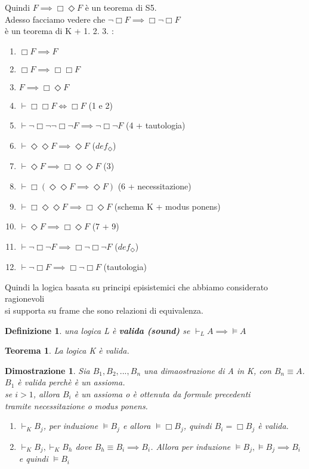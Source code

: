 \documentclass[a4paper,12pt]{article}
\theoremstyle{def}
\newtheorem*{definition}{Definizione}
\theoremstyle{prop}
\theoremstyle{esempio}
\theoremstyle{dimostrazione}
\newtheorem*{dimostrazione}{Dimostrazione}
\theoremstyle{teo}
\newtheorem*{teorema}{Teorema}
\theoremstyle{osservazione}
\begin{document}
Quindi \(F \implies \Box \Diamond F\) è un teorema di S5.\\
\newpage
Adesso facciamo vedere che \(\neg \Box F \implies \Box \neg \Box F\)\\
è un teorema di K + 1. 2. 3. :
\begin{enumerate}
	\item \(\Box F \implies F\)
	\item \(\Box F \implies \Box \Box F\)
	\item \(F \implies \Box \Diamond F\)
	\item \(\vdash \Box \Box F \iff \Box F\) (1 e 2)
	\item \(\vdash \neg \Box \neg \neg \Box \neg F \implies \neg \Box \neg F\) (4 + tautologia)
	\item \(\vdash \Diamond \Diamond F \implies \Diamond F\) (\(def_\Diamond\))
	\item \(\vdash \Diamond F \implies \Box \Diamond \Diamond F\) (3)
	\item \(\vdash \Box(\Diamond \Diamond F \implies \Diamond F)\) (6 + necessitazione)
	\item \(\vdash \Box \Diamond \Diamond F \implies \Box \Diamond F\) (schema K + modus ponens)
	\item \(\vdash \Diamond F \implies \Box \Diamond F\) (7 + 9)
	\item \(\vdash \neg \Box \neg F \implies \Box \neg \Box \neg F\) (\(def_\Diamond\))
	\item \(\vdash \neg \Box F \implies \Box \neg \Box F\) (tautologia)
\end{enumerate}
Quindi la logica basata su principi episistemici che abbiamo considerato ragionevoli\\
si supporta su frame che sono relazioni di equivalenza.\\
\begin{definition}
	una logica L è \textbf{valida (sound)} se \(\vdash_L A \implies \vDash A\)
\end{definition}
\begin{teorema}
	La logica K è valida.
\end{teorema}
\begin{dimostrazione}
	Sia \(B_1,B_2,...,B_n\) una dimaostrazione di A in K, con \(B_n \equiv A\).\\
	\(B_1\) è valida perchè è un assioma.\\
	se \(i > 1\), allora \(B_i\) è un assioma o è ottenuta da formule precedenti\\
	tramite necessitazione o modus ponens.
	\begin{enumerate}
		\item \(\vdash_K B_j\), per induzione \(\vDash B_j\) e allora \(\vDash \Box B_j\), quindi \(B_i = \Box B_j\) è valida.
		\item \(\vdash_K B_j, \vdash_K B_h\) dove \(B_h \equiv B_i \implies B_i\). Allora per induzione \(\vDash B_j, \vDash B_j \implies B_i\)\\
		      e quindi \(\vDash B_i\)
	\end{enumerate}
\end{dimostrazione}
\end{document}
